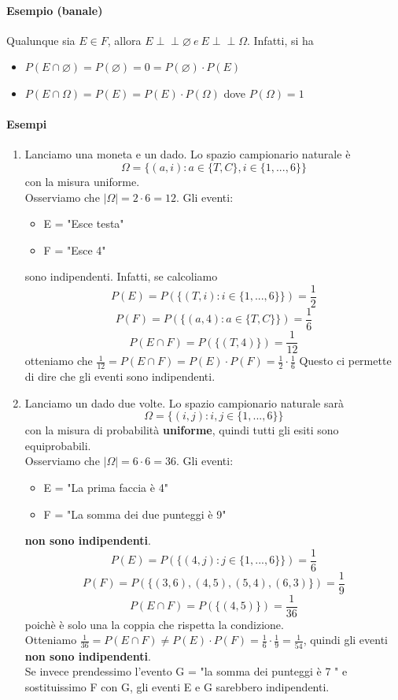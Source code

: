 \documentclass{report}
\newcommand{\indep}{\perp \!\!\! \perp}
\begin{document}
\paragraph{Esempio (banale)}
Qualunque sia \(E \in \textit{F}\), allora \(E \indep \varnothing\ e\ E \indep \Omega\). Infatti, si ha \begin{itemize}
    \item \(P(E \cap \varnothing) = P(\varnothing) = 0 = P(\varnothing) \cdot P(E)\)
    \item \(P(E \cap \Omega) = P(E) = P(E) \cdot P(\Omega)\) dove \(P(\Omega) = 1\)
\end{itemize}
\paragraph{Esempi}
\begin{enumerate}
    \item Lanciamo una moneta e un dado. Lo spazio campionario naturale è \[\Omega = \{(a,i): a \in \{T,C\}, i \in \{1,...,6\}\}\] con la misura uniforme.\\
    Osserviamo che \(|\Omega| = 2\cdot 6 = 12\). Gli eventi: \begin{itemize}
        \item E = "Esce testa"
        \item F = "Esce 4"
    \end{itemize}
    sono indipendenti. Infatti, se calcoliamo \[P(E) = P(\{(T,i): i \in \{1,...,6\}\}) = \frac{1}{2}\] \[P(F) = P(\{(a, 4): a \in \{T,C\}\}) = \frac{1}{6}\] 
    \[P(E \cap F) = P(\{(T,4)\}) = \frac{1}{12}\] otteniamo che \(\frac{1}{12} = P(E \cap F) = P(E)\cdot P(F) = \frac{1}{2}\cdot \frac{1}{6}\)
    Questo ci permette di dire che gli eventi sono indipendenti.
    \item Lanciamo un dado due volte. Lo spazio campionario naturale sarà \[\Omega = \{(i,j): i,j \in \{1,...,6\}\}\] con la misura di probabilità \textbf{uniforme}, quindi tutti gli esiti sono equiprobabili.\\
    Osserviamo che \(|\Omega| = 6 \cdot 6 = 36\). Gli eventi:
    \begin{itemize}
        \item E = "La prima faccia è 4"
        \item F = "La somma dei due punteggi è 9" 
    \end{itemize}
    \textbf{non sono indipendenti}.
    \[P(E) = P(\{(4,j): j \in \{1,...,6\}\}) = \frac{1}{6}\]
    \[P(F) = P(\{(3,6), (4,5), (5,4), (6,3)\}) = \frac{1}{9}\]
    \[P(E \cap F) = P(\{(4,5)\}) = \frac{1}{36}\] poichè è solo una la coppia che rispetta la condizione.\\
    Otteniamo \(\frac{1}{36} = P(E \cap F) \neq P(E)\cdot P(F) = \frac{1}{6} \cdot \frac{1}{9} = \frac{1}{54}\), quindi gli eventi \textbf{non sono indipendenti}.\\
    Se invece prendessimo l'evento G = "la somma dei punteggi è 7 " e sostituissimo F con G, gli eventi E e G sarebbero indipendenti.
\end{enumerate}
\end{document}
